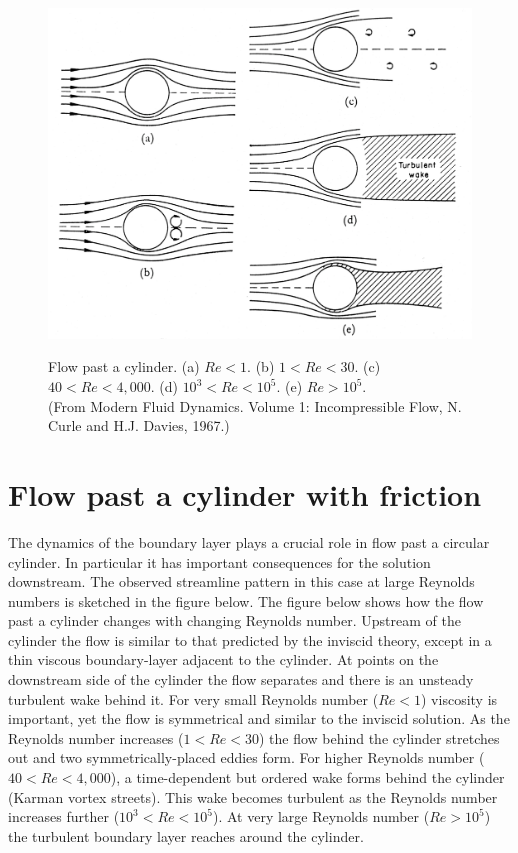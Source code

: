 \documentclass[twoside,a4paper,11pt]{report}
\begin{document}
\begin{figure}[htbp]
\centerline{\includegraphics[width=5in]{Section75.pdf}}
{\bigskip}
\begin{center}
{Flow past a cylinder. (a) $Re < 1$. (b) $1< Re < 30$. (c) $40 < Re < 
4,000$. (d) $10^{3} < Re < 10^{5}$. (e) $Re > 10^{5}$. \\
{\small (From Modern Fluid Dynamics. Volume 1: Incompressible Flow, N. Curle
and H.J. Davies, 1967.)}}
\end{center}
\label{fig5}
\end{figure}



\section{Flow past a cylinder with friction}
The dynamics of the boundary layer plays a crucial role in flow past a 
circular cylinder. In particular it has important consequences for the solution downstream. 
The observed streamline pattern in this case at large Reynolds numbers is 
sketched in the figure below. The figure below shows how the flow past a 
cylinder changes with changing Reynolds number. Upstream of the cylinder the 
flow is similar to that predicted by the inviscid theory, except in a thin 
viscous boundary-layer adjacent to the cylinder. At points on the downstream 
side of the cylinder the flow separates and there is an unsteady turbulent 
wake behind it. For very small Reynolds number ($Re < 1$) viscosity is 
important, yet the flow is symmetrical and similar to the inviscid solution. 
As the Reynolds number increases ($1< Re < 30$) the flow behind the 
cylinder stretches out and two symmetrically-placed eddies form. For higher 
Reynolds number ($40 < Re < 4,000$), a time-dependent but ordered wake 
forms behind the cylinder (Karman vortex streets). This wake becomes 
turbulent as the Reynolds number increases further ($10^{3} < Re < 10^{5}$).
At very large Reynolds number ($Re > 10^{5}$) the turbulent
boundary layer reaches around the cylinder.
\end{document}
